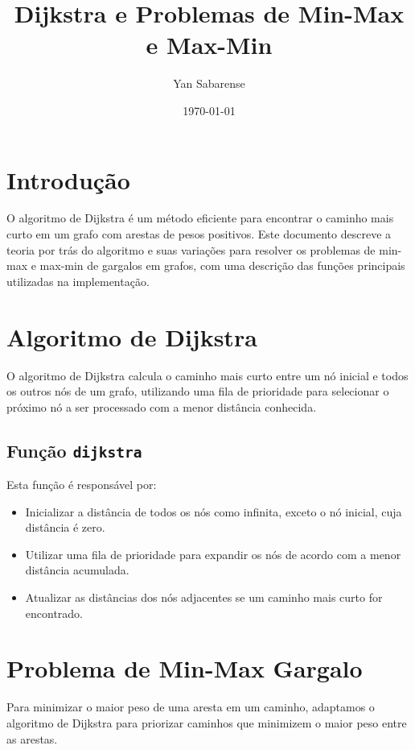 \documentclass{article}
\title{Dijkstra e Problemas de Min-Max e Max-Min}
\author{Yan Sabarense}
\date{\today}
\begin{document}
\maketitle

\section{Introdução}

O algoritmo de Dijkstra é um método eficiente para encontrar o caminho mais curto em um grafo com arestas de pesos positivos. Este documento descreve a teoria por trás do algoritmo e suas variações para resolver os problemas de min-max e max-min de gargalos em grafos, com uma descrição das funções principais utilizadas na implementação.

\section{Algoritmo de Dijkstra}

O algoritmo de Dijkstra calcula o caminho mais curto entre um nó inicial e todos os outros nós de um grafo, utilizando uma fila de prioridade para selecionar o próximo nó a ser processado com a menor distância conhecida. 

\subsection{Função \texttt{dijkstra}}

Esta função é responsável por:

\begin{itemize}
    \item Inicializar a distância de todos os nós como infinita, exceto o nó inicial, cuja distância é zero.
    \item Utilizar uma fila de prioridade para expandir os nós de acordo com a menor distância acumulada.
    \item Atualizar as distâncias dos nós adjacentes se um caminho mais curto for encontrado.
\end{itemize}

\section{Problema de Min-Max Gargalo}

Para minimizar o maior peso de uma aresta em um caminho, adaptamos o algoritmo de Dijkstra para priorizar caminhos que minimizem o maior peso entre as arestas.
\end{document}
